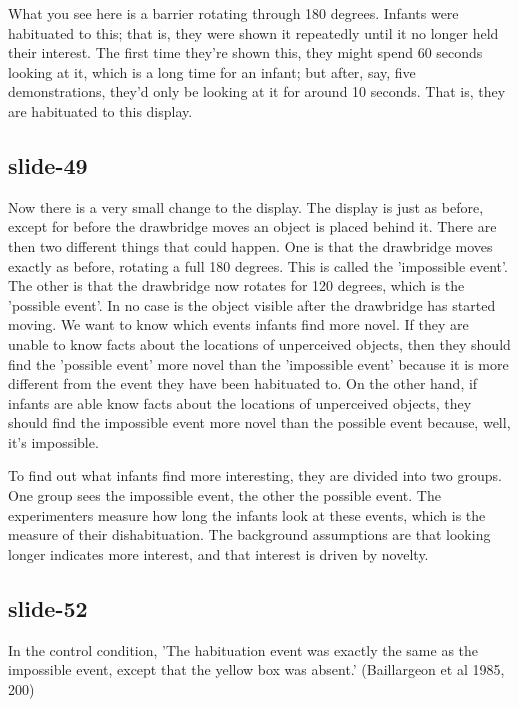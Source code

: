 \documentclass[12pt,\papersize]{extarticle}
\begin{document}
What you see here is a barrier rotating through 180 degrees. Infants were habituated to this; that is, they were shown it repeatedly until it no longer held their interest. The first time they're shown this, they might spend 60 seconds looking at it, which is a long time for an infant; but after, say, five demonstrations, they'd only be looking at it for around 10 seconds. That is, they are habituated to this display.
 
 
 
\subsection{slide-49}
Now there is a very small change to the display. The display is just as before, except for before the drawbridge moves an object is placed behind it. There are then two different things that could happen. One is that the drawbridge moves exactly as before, rotating a full 180 degrees. This is called the 'impossible event'. The other is that the drawbridge now rotates for 120 degrees, which is the 'possible event'. In no case is the object visible after the drawbridge has started moving. We want to know which events infants find more novel. If they are unable to know facts about the locations of unperceived objects, then they should find the 'possible event' more novel than the 'impossible event' because it is more different from the event they have been habituated to. On the other hand, if infants are able know facts about the locations of unperceived objects, they should find the impossible event more novel than the possible event because, well, it's impossible.
 
To find out what infants find more interesting, they are divided into two groups. One group sees the impossible event, the other the possible event. The experimenters measure how long the infants look at these events, which is the measure of their dishabituation. The background assumptions are that looking longer indicates more interest, and that interest is driven by novelty.
 
 
 
\subsection{slide-52}
In the control condition, 'The habituation event was exactly the same as the impossible event, except that the yellow box was absent.' (Baillargeon et al 1985, 200)
 
 
 
\end{document}
